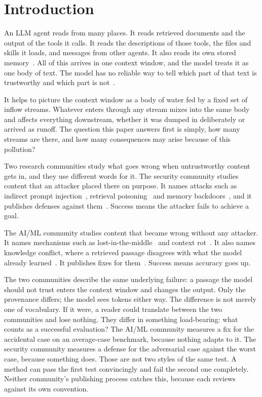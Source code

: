 \section{Introduction}

An LLM agent reads from many places. It reads retrieved documents and the output of the tools it calls. It reads the descriptions of those tools, the files and skills it loads, and messages
from other agents. It also reads its own stored memory~\cite{chu-2026-systematic,ma-2025-safety}. All of this arrives in one context window, and the model treats it as one body of
text. The model has no reliable way to tell which part of that text is trustworthy and which part is not~\cite{greshake-2023-not}.

It helps to picture the context window as a body of water fed by a fixed set
of inflow streams. Whatever enters through any stream mixes into the same body
and affects everything downstream, whether it was dumped in deliberately or
arrived as runoff. The question this paper answers first is simply, how
many streams are there, and how many consequences may arise because of this pollution? 

Two research communities study what goes wrong when untrustworthy content gets
in, and they use different words for it. The security community studies content that an attacker placed there on purpose. It names attacks such as indirect prompt
injection~\cite{greshake-2023-not}, retrieval
poisoning~\cite{zou-2024-poisonedrag,zhong-2023-poisoning} and memory
backdoors~\cite{dash-2026-untrusted}, and it publishes defenses against
them~\cite{xiang-2024-certifiably,liu-2025-datasentinel,an-2025-ipiguard}.
Success means the attacker fails to achieve a goal.

The AI/ML community studies content that became wrong without any
attacker. It names mechanisms such as lost-in-the-middle~\cite{liu-2023-lost} and
context rot~\cite{xia-2026-diagnosing}. It also names knowledge conflict, where a retrieved passage
disagrees with what the model already
learned~\cite{xie-2023-adaptive}. It publishes fixes for
them~\cite{huang-2025-parammute,bi-2025-parameters,yuan-2024-discerning}.
Success means accuracy goes up.

The two communities describe the same underlying failure: a passage the model
should not trust enters the context window and changes the output. Only the
provenance differs; the model sees tokens either way. The difference is not merely one of vocabulary. If it were, a reader could
translate between the two communities and lose nothing. They differ in
something load-bearing: what counts as a successful evaluation? The AI/ML community measures a fix for the accidental case on an average-case
benchmark, because nothing adapts to it. The security community measures a defense for the
adversarial case against the worst case, because something does. Those are not two styles
of the same test. A method can pass the first test convincingly and fail the second one
completely. Neither community's publishing process catches this, because each
reviews against its own convention.

